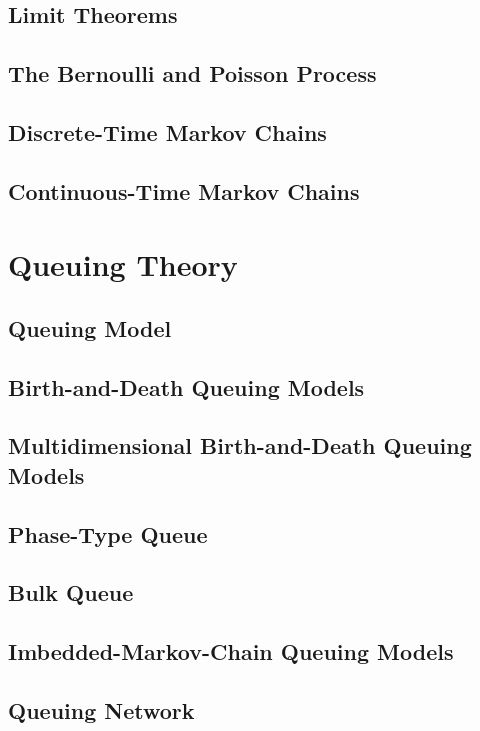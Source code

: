 \documentclass[10pt]{book}
\begin{document}
		\chapter{Limit Theorems}

		\chapter{The Bernoulli and Poisson Process}

		\chapter{Discrete-Time Markov Chains}

		\chapter{Continuous-Time Markov Chains}

	\part{Queuing Theory}
		\chapter{Queuing Model}

		\chapter{Birth-and-Death Queuing Models}

		\chapter{Multidimensional Birth-and-Death Queuing Models}

		\chapter{Phase-Type Queue}

		\chapter{Bulk Queue}

		\chapter{Imbedded-Markov-Chain Queuing Models}

		\chapter{Queuing Network}
\end{document}
